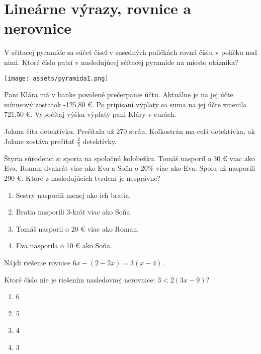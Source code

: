 \chapter{Lineárne výrazy, rovnice a nerovnice}

\begin{example}
	V sčítacej pyramíde sa súčet čisel v susedných poličkách rovná číslu v políčku nad nimi. Ktoré číslo patrí v nasledujúcej sčítacej pyramíde na miesto otáznika?
	\begin{center}
		\texttt{[image: assets/pyramida1.png]}
	\end{center}
\end{example}

\begin{example}
	Pani Klára má v banke povolené prečerpanie účtu. Aktuálne je na jej účte mínusový zostatok -125,80 €. Po pripísaní výplaty sa suma na jej účte zmenila 721,50 €. Vypočítaj výšku výplaty pani Kláry v eurách.  
\end{example}

\begin{example}
	Jolana číta detektívku. Prečítala už 270 strán. Koľkostrán ma celá detektívka, ak Jolane zostáva prečítať $\frac{2}{5}$ detektívky.
\end{example}

\begin{example}
	Štyria súrodenci si sporia na spoločnú kolobežku. Tomáš nasporil o 30 € viac ako Eva, Roman dvakrát viac ako Eva a Soňa o 20\% viac ako Eva. Spolu už nasporili 290 €. Ktoré z nasledujúcich tvrdení je nesprávne?
	
	\begin{enumerate}
		\item Sestry nasporili menej ako ich bratia.
		\item Bratia nasporili 3-krát viac ako Soňa.
		\item Tomáš nasporil o 20 € viac ako Roman.
		\item Eva nasporila o 10 € ako Soňa.
	\end{enumerate}
\end{example}

\begin{example}
	Nájdi riešenie rovnice $6x - (2 - 2x) = 3(x-4)$.
\end{example}

\begin{example}
	Ktoré číslo nie je riešením nasledovnej nerovnice: $3 < 2(3x-9)$?
	
	\begin{enumerate}
		\item 6
		\item 5
		\item 4
		\item 3
	\end{enumerate}
\end{example}

